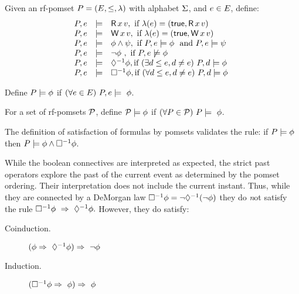\begin{definition} [Satisfaction]
  Given an rf-pomset $P= (E, {\le}, \lambda)$ with alphabet
  $\Sigma$, and $e \in E$, define:
  \begin{displaymath}
    \begin{array}{lrl}
      \aPS,\aEv & \models& \DR{\aLoc}{\aVal}, \ \mbox{if } \labelling(\aEv) =  (\TRUE, \DR{\aLoc}{\aVal}) \\
      \aPS,\aEv &\models& \DW{\aLoc}{\aVal}, \ \mbox{if } \labelling(\aEv) =  (\TRUE, \DW{\aLoc}{\aVal}) \\
      \aPS,\aEv &\models&  \afo\wedge\bfo, \ \mbox{if } \aPS,\aEv \models  \afo\ \mbox{ and } \aPS,\aEv \models  \bfo\  \\
      \aPS,\aEv &\models&  \neg\afo\ , \ \mbox{if } \aPS,\aEv \not\models \afo \\
      \aPS,\aEv &\models& \once\afo, \mbox{if } (\exists \bEv \le \aEv, \bEv\not=\aEv) \  \aPS,\bEv \models \afo\  \\
      \aPS,\aEv &\models& \pastalways\afo, \mbox{if } (\forall \bEv \le \aEv, \bEv\not=\aEv) \  \aPS,\bEv \models \afo\ 
    \end{array} 
  \end{displaymath}

  Define $P \models \phi$ if $(\forall \aEv \in \Event) \ \aPS,\aEv  \models\ \afo$.

  For a set of rf-pomsets $\mathcal{P}$, define $\mathcal{P}\models \phi$ if $(\forall \aPS \in \aPSS) \ \aPS \models\ \afo$.
\end{definition}
The definition of satisfaction of formulas by pomsets validates the rule: if
$P \models \phi$ then $P \models \phi \wedge \Box^{-1}\phi$.

While the boolean connectives are interpreted as expected, the strict past
operators explore the past of the current event as determined by the pomset
ordering.  Their interpretation does not include the current instant.  Thus,
while they are connected by a DeMorgan law
\begin{math}
  \Box^{-1}\phi = \neg\Diamond^{-1}(\neg\phi)
\end{math}
they do {\emph not} satisfy the rule
\begin{math}
  \Box^{-1}\phi\ \Rightarrow\ \Diamond^{-1}\phi.
\end{math}
However, they do satisfy:
\begin{description}
\item[Coinduction.]
  \begin{math}
    (\phi \Rightarrow\ \Diamond^{-1}{\phi}) \Rightarrow\ \neg \phi
  \end{math}
\item[Induction.] 
  \begin{math}
    (\Box^{-1}\phi \Rightarrow\ \phi) \Rightarrow\ \phi
  \end{math}
\end{description}

